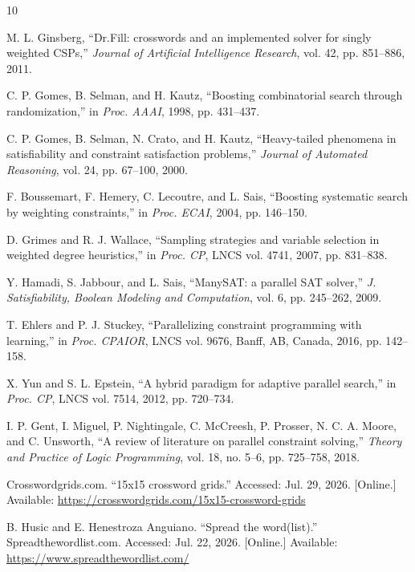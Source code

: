 \documentclass[conference]{IEEEtran}
\begin{document}
\begin{thebibliography}{10}

 M. L. Ginsberg, ``Dr.Fill: crosswords and an implemented solver for singly weighted CSPs,'' \textit{Journal of Artificial Intelligence Research}, vol. 42, pp. 851--886, 2011.

 C. P. Gomes, B. Selman, and H. Kautz, ``Boosting combinatorial search through randomization,'' in \textit{Proc. AAAI}, 1998, pp. 431--437.

 C. P. Gomes, B. Selman, N. Crato, and H. Kautz, ``Heavy-tailed phenomena in satisfiability and constraint satisfaction problems,'' \textit{Journal of Automated Reasoning}, vol. 24, pp. 67--100, 2000.

 F. Boussemart, F. Hemery, C. Lecoutre, and L. Sais, ``Boosting systematic search by weighting constraints,'' in \textit{Proc. ECAI}, 2004, pp. 146--150.

 D. Grimes and R. J. Wallace, ``Sampling strategies and variable selection in weighted degree heuristics,'' in \textit{Proc. CP}, LNCS vol. 4741, 2007, pp. 831--838.

 Y. Hamadi, S. Jabbour, and L. Sais, ``ManySAT: a parallel SAT solver,'' \textit{J. Satisfiability, Boolean Modeling and Computation}, vol. 6, pp. 245--262, 2009.

 T. Ehlers and P. J. Stuckey, ``Parallelizing constraint programming with learning,'' in \textit{Proc. CPAIOR}, LNCS vol. 9676, Banff, AB, Canada, 2016, pp. 142--158.

 X. Yun and S. L. Epstein, ``A hybrid paradigm for adaptive parallel search,'' in \textit{Proc. CP}, LNCS vol. 7514, 2012, pp. 720--734.

 I. P. Gent, I. Miguel, P. Nightingale, C. McCreesh, P. Prosser, N. C. A. Moore, and C. Unsworth, ``A review of literature on parallel constraint solving,'' \textit{Theory and Practice of Logic Programming}, vol. 18, no. 5--6, pp. 725--758, 2018.

 Crosswordgrids.com. ``15x15 crossword grids.'' Accessed: Jul. 29, 2026. [Online.] Available: \url{https://crosswordgrids.com/15x15-crossword-grids}

 B. Husic and E. Henestroza Anguiano. ``Spread the word(list).'' Spreadthewordlist.com. Accessed: Jul. 22, 2026. [Online.] Available: \url{https://www.spreadthewordlist.com/}


\end{thebibliography}
\end{document}
